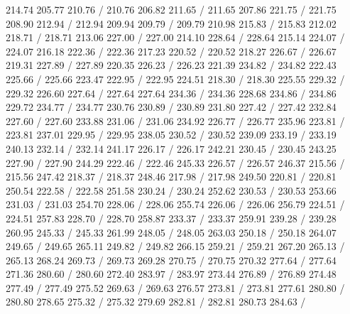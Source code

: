 { 214.74 205.77 210.76 /
 210.76 206.82 211.65 /
 211.65 207.86 221.75 /
 221.75 208.90 212.94 /
 212.94 209.94 209.79 /
 209.79 210.98 215.83 /
 215.83 212.02 218.71 /
 218.71 213.06 227.00 /
 227.00 214.10 228.64 /
 228.64 215.14 224.07 /
 224.07 216.18 222.36 /
 222.36 217.23 220.52 /
 220.52 218.27 226.67 /
 226.67 219.31 227.89 /
 227.89 220.35 226.23 /
 226.23 221.39 234.82 /
 234.82 222.43 225.66 /
 225.66 223.47 222.95 /
 222.95 224.51 218.30 /
 218.30 225.55 229.32 /
 229.32 226.60 227.64 /
 227.64 227.64 234.36 /
 234.36 228.68 234.86 /
 234.86 229.72 234.77 /
 234.77 230.76 230.89 /
 230.89 231.80 227.42 /
 227.42 232.84 227.60 /
 227.60 233.88 231.06 /
 231.06 234.92 226.77 /
 226.77 235.96 223.81 /
 223.81 237.01 229.95 /
 229.95 238.05 230.52 /
 230.52 239.09 233.19 /
 233.19 240.13 232.14 /
 232.14 241.17 226.17 /
 226.17 242.21 230.45 /
 230.45 243.25 227.90 /
 227.90 244.29 222.46 /
 222.46 245.33 226.57 /
 226.57 246.37 215.56 /
 215.56 247.42 218.37 /
 218.37 248.46 217.98 /
 217.98 249.50 220.81 /
 220.81 250.54 222.58 /
 222.58 251.58 230.24 /
 230.24 252.62 230.53 /
 230.53 253.66 231.03 /
 231.03 254.70 228.06 /
 228.06 255.74 226.06 /
 226.06 256.79 224.51 /
 224.51 257.83 228.70 /
 228.70 258.87 233.37 /
 233.37 259.91 239.28 /
 239.28 260.95 245.33 /
 245.33 261.99 248.05 /
 248.05 263.03 250.18 /
 250.18 264.07 249.65 /
 249.65 265.11 249.82 /
 249.82 266.15 259.21 /
 259.21 267.20 265.13 /
 265.13 268.24 269.73 /
 269.73 269.28 270.75 /
 270.75 270.32 277.64 /
 277.64 271.36 280.60 /
 280.60 272.40 283.97 /
 283.97 273.44 276.89 /
 276.89 274.48 277.49 /
 277.49 275.52 269.63 /
 269.63 276.57 273.81 /
 273.81 277.61 280.80 /
 280.80 278.65 275.32 /
 275.32 279.69 282.81 /
 282.81 280.73 284.63 /
}
